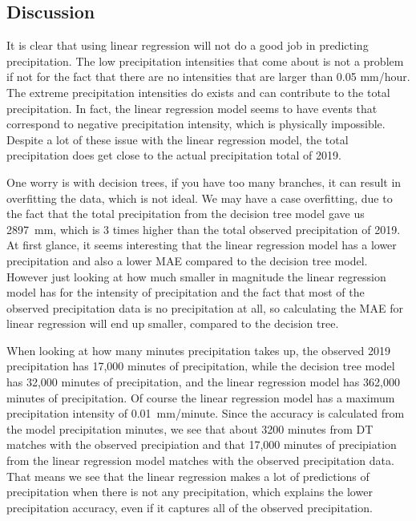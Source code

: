 \documentclass[11pt]{report}
\begin{document}
\subsection{Discussion}
It is clear that using linear regression will not do a good job in
predicting precipitation. The low precipitation intensities that come
about is not a problem if not for the fact that there are no intensities
that are larger than 0.05 mm/hour. The extreme precipitation intensities
do exists and can contribute to the total precipitation. In fact, the
linear regression model seems to have events that correspond to negative
precipitation intensity, which is physically impossible. Despite a lot of
these issue with the linear regression model, the total precipitation
does get close to the actual precipitation total of 2019. 

One worry is with decision trees, if you have too many branches, it can
result in overfitting the data, which is not ideal. We may have a case
overfitting, due to the fact that the total precipitation from the decision tree model gave us 2897~mm, which is 3 times higher than the total observed precipitation of 2019. At first glance, it seems interesting that the linear regression model has a lower precipitation and also a lower MAE compared to the decision tree model. However just looking at how much smaller in magnitude the linear regression model has for the intensity of precipitation and the fact that most of the observed precipitation data is no precipitation at all, so calculating the MAE for linear regression will end up smaller, compared to the decision tree. 

When looking at how many minutes precipitation takes up, the observed 2019 precipitation has 17,000 minutes of precipitation, while the decision tree model has 32,000 minutes of precipitation, and the linear regression model has 362,000 minutes of precipitation. Of course the linear regression model has a maximum precipitation intensity of 0.01~mm/minute. Since the accuracy is calculated from the model precipitation minutes, we see that about 3200 minutes from DT matches with the observed precipiation and that 17,000 minutes of precipiation from the linear regression model matches with the observed precipitation data. That means we see that the linear regression makes a lot of predictions of precipitation when there is not any precipitation, which explains the lower precipitation accuracy, even if it captures all of the observed precipitation. 

\clearpage
\end{document}
